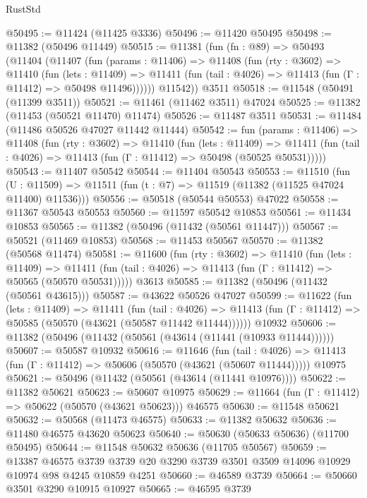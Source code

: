 \begin{lexlean}{RustStd}
\begin{coremodule}
@50495 := @11424 (@11425 @3336)
@50496 := @11420 @50495
@50498 := @11382 (@50496 @11449)
@50515 := @11381
    (fun (fn : @89) =>
    @50493
      (@11404
        (@11407
          (fun (params : @11406) =>
          @11408
            (fun (rty : @3602) =>
            @11410
              (fun (lets : @11409) =>
              @11411 (fun (tail : @4026) => @11413 (fun (Γ : @11412) => @50498 @11496))))))
        @11542))
    @3511
@50518 := @11548 (@50491 (@11399 @3511))
@50521 := @11461 (@11462 @3511) @47024
@50525 := @11382 (@11453 (@50521 @11470) @11474)
@50526 := @11487 @3511
@50531 := @11484 (@11486 @50526 @47027 @11442 @11444)
@50542 := fun (params : @11406) =>
  @11408
    (fun (rty : @3602) =>
    @11410
      (fun (lets : @11409) =>
      @11411 (fun (tail : @4026) => @11413 (fun (Γ : @11412) => @50498 (@50525 @50531)))))
@50543 := @11407 @50542
@50544 := @11404 @50543
@50553 := @11510
    (fun (U : @11509) => @11511 (fun (t : @7) => @11519 (@11382 (@11525 @47024 @11400) @11536)))
@50556 := @50518 (@50544 @50553) @47022
@50558 := @11367 @50543 @50553
@50560 := @11597 @50542 @10853
@50561 := @11434 @10853
@50565 := @11382 (@50496 (@11432 (@50561 @11447)))
@50567 := @50521 (@11469 @10853)
@50568 := @11453 @50567
@50570 := @11382 (@50568 @11474)
@50581 := @11600
    (fun (rty : @3602) =>
    @11410
      (fun (lets : @11409) =>
      @11411 (fun (tail : @4026) => @11413 (fun (Γ : @11412) => @50565 (@50570 @50531)))))
    @3613
@50585 := @11382 (@50496 (@11432 (@50561 @43615)))
@50587 := @43622 @50526 @47027
@50599 := @11622
    (fun (lets : @11409) =>
    @11411
      (fun (tail : @4026) =>
      @11413 (fun (Γ : @11412) => @50585 (@50570 (@43621 (@50587 @11442 @11444))))))
    @10932
@50606 := @11382 (@50496 (@11432 (@50561 (@43614 (@11441 (@10933 @11444))))))
@50607 := @50587 @10932
@50616 := @11646
    (fun (tail : @4026) => @11413 (fun (Γ : @11412) => @50606 (@50570 (@43621 (@50607 @11444)))))
    @10975
@50621 := @50496 (@11432 (@50561 (@43614 (@11441 @10976))))
@50622 := @11382 @50621
@50623 := @50607 @10975
@50629 := @11664 (fun (Γ : @11412) => @50622 (@50570 (@43621 @50623))) @46575
@50630 := @11548 @50621
@50632 := @50568 (@11473 @46575)
@50633 := @11382 @50632
@50636 := @11480 @46575 @43620 @50623
@50640 := @50630 (@50633 @50636) (@11700 @50495)
@50644 := @11548 @50632 @50636 (@11705 @50567)
@50659 := @13387
    @46575
    @3739
    @3739
    @20
    @3290
    @3739
    @3501
    @3509
    @14096
    @10929
    @10974
    @98
    @4245
    @10859
    @4251
@50660 := @46589 @3739
@50664 := @50660 @3501 @3290 @10915 @10927
@50665 := @46595 @3739

\end{coremodule}
\end{lexlean}
